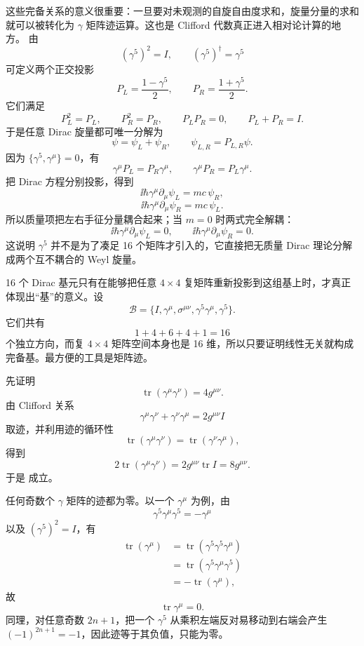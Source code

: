 这些完备关系的意义很重要：一旦要对未观测的自旋自由度求和，旋量分量的求和就可以被转化为 $\gamma$ 矩阵迹运算。这也是 Clifford 代数真正进入相对论计算的地方。
由
\[
(\gamma^5)^2=I,
\qquad
(\gamma^5)^\dagger=\gamma^5
\]
可定义两个正交投影
\[
P_L=\frac{1-\gamma^5}{2},
\qquad
P_R=\frac{1+\gamma^5}{2}.
\]
它们满足
\[
P_L^2=P_L,
\qquad
P_R^2=P_R,
\qquad
P_LP_R=0,
\qquad
P_L+P_R=I.
\]
于是任意 Dirac 旋量都可唯一分解为
\[
\psi=\psi_L+\psi_R,
\qquad
\psi_{L,R}=P_{L,R}\psi.
\]
因为 $\{\gamma^5,\gamma^\mu\}=0$，有
\[
\gamma^\mu P_L=P_R\gamma^\mu,
\qquad
\gamma^\mu P_R=P_L\gamma^\mu.
\]
把 Dirac 方程分别投影，得到
\[
\ii\hbar\gamma^\mu\partial_\mu\psi_L=mc\,\psi_R,
\]
\[
\ii\hbar\gamma^\mu\partial_\mu\psi_R=mc\,\psi_L.
\]
所以质量项把左右手征分量耦合起来；当 $m=0$ 时两式完全解耦：
\[
\ii\hbar\gamma^\mu\partial_\mu\psi_L=0,
\qquad
\ii\hbar\gamma^\mu\partial_\mu\psi_R=0.
\]
这说明 $\gamma^5$ 并不是为了凑足 16 个矩阵才引入的，它直接把无质量 Dirac 理论分解成两个互不耦合的 Weyl 旋量。

16 个 Dirac 基元只有在能够把任意 $4\times4$ 复矩阵重新投影到这组基上时，才真正体现出“基”的意义。设
\[
\mathcal B
=\{I,\gamma^\mu,\sigma^{\mu\nu},\gamma^5\gamma^\mu,\gamma^5\}.
\]
它们共有
\[
1+4+6+4+1=16
\]
个独立方向，而复 $4\times4$ 矩阵空间本身也是 16 维，所以只要证明线性无关就构成完备基。最方便的工具是矩阵迹。

先证明
\begin{equation}
{
\operatorname{tr}(\gamma^\mu\gamma^\nu)=4g^{\mu\nu}
}.
\label{eq:gamma-trace-two}
\end{equation}
由 Clifford 关系
\[
\gamma^\mu\gamma^\nu+\gamma^\nu\gamma^\mu
=2g^{\mu\nu}I
\]
取迹，并利用迹的循环性
\[
\operatorname{tr}(\gamma^\mu\gamma^\nu)
=\operatorname{tr}(\gamma^\nu\gamma^\mu),
\]
得到
\[
2\operatorname{tr}(\gamma^\mu\gamma^\nu)
=2g^{\mu\nu}\operatorname{tr}I
=8g^{\mu\nu}.
\]
于是  成立。

任何奇数个 $\gamma$ 矩阵的迹都为零。以一个 $\gamma^\mu$ 为例，由
\[
\gamma^5\gamma^\mu\gamma^5=-\gamma^\mu
\]
以及 $(\gamma^5)^2=I$，有
\[
\begin{aligned}
\operatorname{tr}(\gamma^\mu)
&=\operatorname{tr}(\gamma^5\gamma^5\gamma^\mu)\\
&=\operatorname{tr}(\gamma^5\gamma^\mu\gamma^5)\\
&=-\operatorname{tr}(\gamma^\mu),
\end{aligned}
\]
故
\[
\operatorname{tr}\gamma^\mu=0.
\]
同理，对任意奇数 $2n+1$，把一个 $\gamma^5$ 从乘积左端反对易移动到右端会产生 $(-1)^{2n+1}=-1$，因此迹等于其负值，只能为零。

